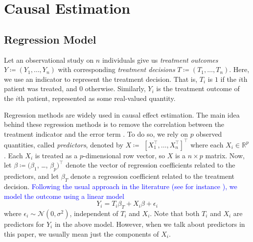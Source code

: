 \documentclass[preprint,12pt]{elsarticle}
\newcommand{\added}[1]{\textcolor{blue}{#1}}
\begin{document}
\section{Causal Estimation}\label{sec:causal}

\subsection{Regression Model}

Let an observational study on $n$ individuals give us
\emph{treatment outcomes} $Y\coloneqq(Y_1, \dots, Y_n)$ with 
corresponding \emph{treatment decisions} $T\coloneqq(T_1, \dots, T_n)$.
Here, we use an indicator to represent the treatment decision. That is, $T_i$ is $1$ if the $i$th patient was treated, and $0$ otherwise. Similarly,
$Y_i$ is the treatment outcome of the $i$th patient, represented as some real-valued quantity.

Regression methods are widely used in causal effect estimation. The
main idea behind these regression methods is to remove the
correlation between the treatment indicator and the error term
\citep{winship99,HECKMAN1985}.
To do so, we rely on $p$ observed quantities, called
\emph{predictors}, denoted by $X\coloneqq$ $[X_1^{\top}, \dots, X_n^{\top}]^{\top}$
where each $X_i\in\mathbb{R}^p$.
Each $X_i$ is treated as a $p$-dimensional row vector,
so $X$ is a $n\times p$ matrix.
Now, let
$\beta \coloneqq (\beta_1$, \dots, $\beta_p)^{\top}$ denote the vector of regression
coefficients
related to the predictors, and let $\beta_T$ denote a regression coefficient related to the
treatment decision.
\added{%
Following the usual approach in the literature
(see for instance \citep{winship99,HECKMAN1985}),
we model the outcome using a linear model%
}
\begin{equation}
	Y_i =  T_i \beta_{T} + X_i\beta + \epsilon_i
\end{equation}
where $\epsilon_i\sim \mathcal{N}(0, \sigma^2)$,
independent of $T_i$ and $X_i$.
Note that both $T_i$ and $X_i$ are predictors for $Y_i$ in the above model.
However, when we talk about predictors in this paper, we usually mean just the components of $X_i$.
\end{document}
